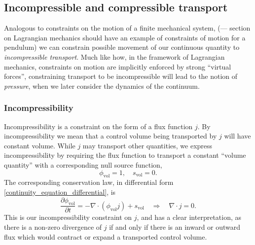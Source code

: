 \documentclass[11pt,a4paper]{memoir}
\newcommand{\Part}[2]{\frac{\partial #1}{\partial #2}}
\begin{document}
\subsection{Incompressible and compressible transport}
Analogous to constraints on the motion of a finite mechanical system,
(--- section on Lagrangian mechanics should have an example of constraints of motion for a pendulum)
we can constrain possible movement of our continuous quantity to \textit{incompressible transport}. Much like how, in the framework of Lagrangian mechanics,
constraints on motion are implicitly enforced by strong ``virtual forces'', constraining transport to be incompressible will lead to
the notion of \textit{pressure}, when we later consider the dynamics of the continuum.

\subsubsection{Incompressibility}
Incompressibility is a constraint on the form of a flux function $j$.
By incompressibility we mean that a control volume being transported by $j$ will have
constant volume. While $j$ may transport other quantities, we express incompressibility by requiring the flux function to transport a constant ``volume quantity''
with a corresponding null source function,
    $$\phi_{\text{vol}} = 1,\quad s_{\text{vol}} = 0.$$
The corresponding conservation law, in differential form \eqref{continuity_equation_differential}, is
\begin{equation}\label{volume_conservation_law}
    \Part{\phi_{\text{vol}}}{t} = -\nabla \cdot (\phi_{\text{vol}}j) + s_{\text{vol}}
        \quad\Rightarrow\quad \nabla\cdot j = 0.
\end{equation}
This is our incompressibility constraint on $j$, and has a clear interpretation, as there is a non-zero divergence of $j$ if and only if
there is an inward or outward flux which would contract or expand a transported control volume.
\end{document}

